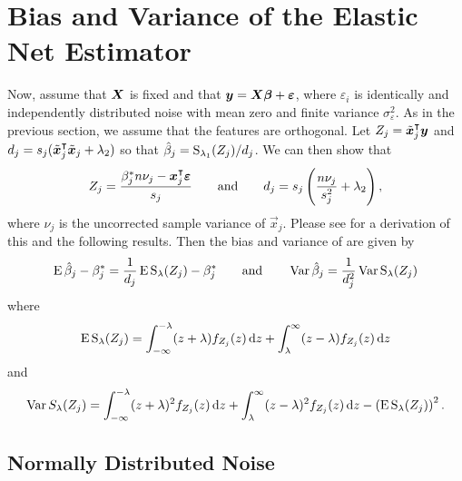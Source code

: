 \section{Bias and Variance of the Elastic Net Estimator}\label{sec:theory}

Now, assume that \(\boldsymbol{X}\) is fixed and that \(\boldsymbol{y} = \boldsymbol{X}\boldsymbol{\beta} +
\boldsymbol{\varepsilon}\), where \(\varepsilon_i\) is identically and independently distributed
noise with mean zero and finite variance \(\sigma_\varepsilon^2\). As in the previous
section, we assume that the features are orthogonal. Let \({Z_j} = \tilde{\boldsymbol{x}}_j^\intercal
\boldsymbol{y}\) and \(d_j = s_j(\tilde{\boldsymbol{x}}_j^\intercal \tilde{\boldsymbol{x}}_j + \lambda_2)\) so that
\(\hat{\beta}_j = \operatorname{S}_{\lambda_1}({Z_j})/d_j\). We can then show that
\begin{equation}
  \label{eq:z-d}
  {Z_j} = \frac{\beta_j^* n \nu_j- \boldsymbol{x}_j^\intercal \boldsymbol{\varepsilon}}{s_j}
  \qquad\text{and}\qquad
  d_j = s_j\left(\frac{n \nu_j}{s_j^2} + \lambda_2\right),
\end{equation}
where \(\nu_j\) is the uncorrected sample variance of \(\vec{x}_j\). Please see
 for a derivation of this and the following results.
Then the bias and variance of  are given by
\begin{equation*}
  \operatorname{E} \hat\beta_j - \beta_j^* = \frac{1}{d_j}\operatorname{E} \operatorname{S}_\lambda({Z_j}) - \beta^*_j
  \qquad\text{and}\qquad
  \operatorname{Var} \hat\beta_j = \frac{1}{d_j^2} \operatorname{Var} \operatorname{S}_\lambda({Z_j})
\end{equation*}
where
\begin{equation*}
  \operatorname{E} \operatorname{S}_\lambda({Z_j}) = \int_{-\infty}^{-\lambda}(z + \lambda)f_{Z_j}(z) \mathop{}\!\mathrm{d} z + \int_{\lambda}^\infty (z - \lambda)f_{Z_j}(z) \mathop{}\!\mathrm{d} z
\end{equation*}
%
and
\begin{equation}
  \label{eq:st-variance}
  \operatorname{Var} {S_\lambda({Z_j})} = \int_{-\infty}^{-\lambda}(z + \lambda)^2f_{Z_j}(z) \mathop{}\!\mathrm{d} z + \int_{\lambda}^\infty (z - \lambda)^2 f_{Z_j}(z) \mathop{}\!\mathrm{d} z - \left(\operatorname{E} \operatorname{S}_\lambda({Z_j})\right)^2.
\end{equation}

\subsection{Normally Distributed Noise}

